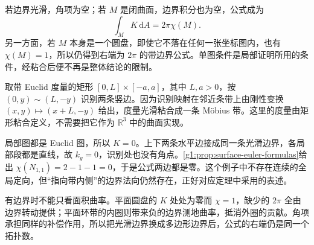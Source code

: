 若边界光滑，角项为空；若 \(M\) 是闭曲面，边界积分也为空，公式成为
\begin{equation}\label{g1:eq:closed-gauss-bonnet}
	\int_MK\,\mathrm{d}A=2\pi\chi(M).
\end{equation}
另一方面，若 \(M\) 本身是一个圆盘，即使它不落在任何一张坐标图内，也有 \(\chi(M)=1\)，所以仍得到右端为 \(2\pi\) 的带边界公式。单图条件是局部证明所用的条件，经粘合后便不再是整体结论的限制。

\begin{example}\label{g1:exm:flat-mobius-gauss-bonnet}
	取带 Euclid 度量的矩形 \([0,L]\times[-a,a]\)，其中 \(L,a>0\)，按 \((0,y)\sim(L,-y)\) 识别两条竖边。因为识别映射在邻近条带上由刚性变换 \((x,y)\mapsto(x+L,-y)\) 给出，度量光滑粘合成一条 Möbius 带。这里的度量由矩形粘合定义，不需要把它作为 \(\mathbb R^3\) 中的曲面实现。

	局部图都是 Euclid 图，所以 \(K=0\)。上下两条水平边接成同一条光滑边界，各局部段都是直线，故 \(k_g=0\)，识别处也没有角点。\cref{g1:prop:surface-euler-formulas}给出 \(\chi(N_{1,1})=2-1-1=0\)，于是公式两边都是零。这个例子中不存在连续的全局定向，但“指向带内侧”的边界法向仍然存在，正好对应定理中采用的表述。
\end{example}

有边界时不能只看面积曲率。平面圆盘的 \(K\) 处处为零而 \(\chi=1\)，缺少的 \(2\pi\) 全由边界转动提供；平面环带的内圈则带来负的边界测地曲率，抵消外圈的贡献。角项承担同样的补偿作用，所以把光滑边界换成多边形边界后，公式的右端仍是同一个拓扑数。
